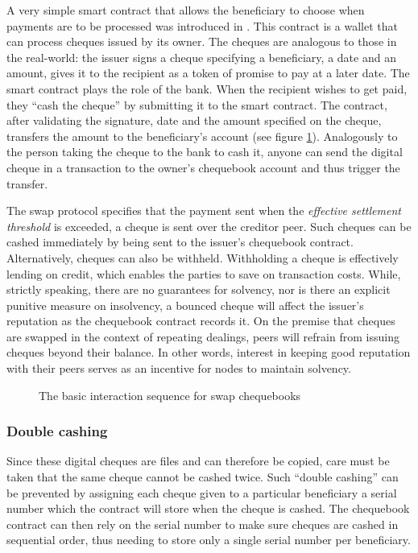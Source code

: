 A very simple smart contract that allows the beneficiary to choose when payments are to be processed was introduced in \cite{ethersphere2016sw3}. This  contract is a wallet that can process cheques issued by its owner. The cheques are analogous to those in the real-world: the issuer signs a cheque specifying a beneficiary, a date and an amount, gives it to the recipient as a token of promise to pay at a later date. The smart contract plays the role of the bank. When the recipient wishes to get paid, they ``cash the cheque'' by submitting it to the smart contract. The contract, after validating the signature, date and the amount specified on the cheque, transfers the amount to the beneficiary's account (see figure \ref{fig:swap-chequebook}). Analogously to the person taking the cheque to the bank to cash it, anyone can send the digital cheque in a transaction to the owner's chequebook account and thus trigger the transfer. 

The swap protocol specifies that the payment sent when the \emph{effective settlement threshold} is exceeded, a cheque is sent over the creditor peer. Such cheques can be cashed immediately by being sent to the issuer's chequebook contract. Alternatively, cheques can also be withheld. Withholding a cheque is effectively lending on credit, which enables the parties to save on transaction costs. While, strictly speaking, there are no guarantees for solvency, nor is there an explicit punitive measure on insolvency, a bounced cheque will affect the issuer's reputation as the chequebook contract records it. On the premise that cheques are swapped in the context of repeating dealings, peers will refrain from issuing cheques beyond their balance. In other words, interest in keeping good reputation with their peers serves as an incentive for nodes to maintain solvency.


\begin{figure}[htbp]
\centering

\caption{The basic interaction sequence for swap chequebooks}
\label{fig:swap-chequebook}
\end{figure}


\subsubsection{Double cashing}

Since these digital cheques are files and can therefore be copied, care must be taken that the same cheque cannot be cashed twice. Such ``double cashing'' can be prevented by assigning each cheque given to a particular beneficiary a serial number which the contract will store when the cheque is cashed. The chequebook contract can then rely on the serial number to make sure cheques are cashed in sequential order, thus needing to store only a single serial number per beneficiary.

